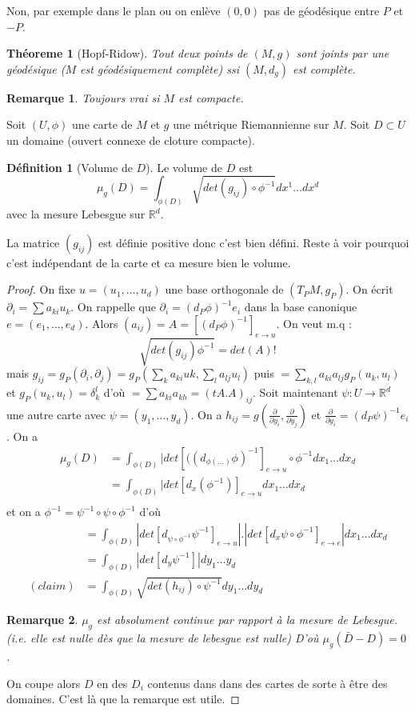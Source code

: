 \documentclass[a4paper,12pt]{book}
\newcommand{\R}{\mathbb{R}}
\theoremstyle{plain}
\newtheorem{thm}[subsection]{Théoreme}
\newtheorem{rem}{Remarque}
\theoremstyle{definition}
\newtheorem{defn}[subsection]{Définition}
\theoremstyle{remark}
\begin{document}
Non, par exemple dans le plan ou on enlève $(0,0)$ pas de géodésique
entre $P$ et $-P$.
\begin{thm}[Hopf-Ridow]
    Tout deux points de $(M,g)$ sont joints par une géodésique ($M$ est
    géodésiquement complète) ssi $(M, d_g)$ est complète.
\end{thm}
\begin{rem}
    Toujours vrai si $M$ est compacte. 
\end{rem}

Soit $(U,\phi)$ une carte de $M$ et $g$ une métrique Riemannienne sur 
$M$. Soit $D\subset U$ un domaine (ouvert connexe de cloture compacte).

\begin{defn}[Volume de $D$]
Le volume de $D$ est \[\mu_g(D)=\int_{\phi(D)} \sqrt{det(g_{ij})\circ\phi^{-1}} dx^1\ldots dx^{d}\]
    avec la mesure Lebesgue sur $\R^d$.
\end{defn}
La matrice $(g_{ij})$ est définie positive donc c'est bien défini. Reste
à voir pourquoi c'est indépendant de la carte et ca mesure bien le 
volume. 
\begin{proof}
    On fixe $u=(u_1,\ldots, u_d)$ une base orthogonale de $(T_PM,g_P)$.
    On écrit $\partial_i=\sum a_{ki}u_k$. On rappelle que $\partial_i=
    (d_P\phi)^{-1}e_i$ dans la base canonique $e=(e_1,\ldots,e_d)$. Alors
    $(a_{ij})=A=[(d_P\phi)^{-1}]_{e\to u}$. On veut m.q :
    \[\sqrt{det(g_{ij})\phi^{-1}}=det(A)!\]
    mais $g_{ij}=g_P(\partial_i,\partial_j)=g_P(\sum_ka_{ki}uk,\sum_l a_{lj}u_l)$
    puis $=\sum_{k,l} a_{ki}a_{lj}g_P(u_k,u_l)$ et 
    $g_P(u_k,u_l)=\delta_k^l$ d'où $=\sum a_{ki}a_{kh}=(tA.A)_{ij}$.
    Soit maintenant $\psi\colon U\to \R^d$ une autre carte avec $\psi=
    (y_1,\ldots,y_d)$. On a $h_{ij}=g(\frac{\partial}{\partial y_i},\frac{\partial}{\partial y_j})$ et 
    $\frac{\partial}{\partial y_i}=(d_P\psi)^{-1}e_i$. On a 
    \begin{align*}
        \mu_g(D)&=\int_{\phi(D)}|det[((d_{\phi(\ldots)}\phi)^{-1}]_{e\to u}\circ \phi^{-1} dx_1\ldots dx_d\\
                &=\int_{\phi(D)} |det[d_x(\phi^{-1})]_{e\to u}dx_1\ldots dx_d\\
    \end{align*}
    et on a $\phi^{-1}=\psi^{-1}\circ\psi\circ\phi^{-1}$ d'où
    \begin{align*}
        &=\int_{\phi(D)}|det[d_{\psi\circ\phi^{-1}}\psi^{-1}]_{e\to u}
                |.|det[d_x\psi\circ\phi^{-1}]_{e\to e}|dx_1\ldots dx_d\\
        &=\int_{\phi(D)}|det[d_y\psi^{-1}]|dy_1\ldots y_d\\
        (claim)&=\int_{\phi(D)}\sqrt{det(h_{ij})\circ\psi^{-1}}dy_1\ldots dy_d
    \end{align*}
    \begin{rem}
        $\mu_g$ est absolument continue par rapport à la mesure de 
        Lebesgue. (i.e. elle est nulle dès que la mesure de lebesgue est
        nulle) D'où $\mu_g(\bar D- D)=0$.
    \end{rem}
    On coupe alors $D$ en des $D_i$ contenus dans dans des cartes 
    de sorte à être des domaines. C'est là que la remarque est utile.
\end{proof}
\end{document}

